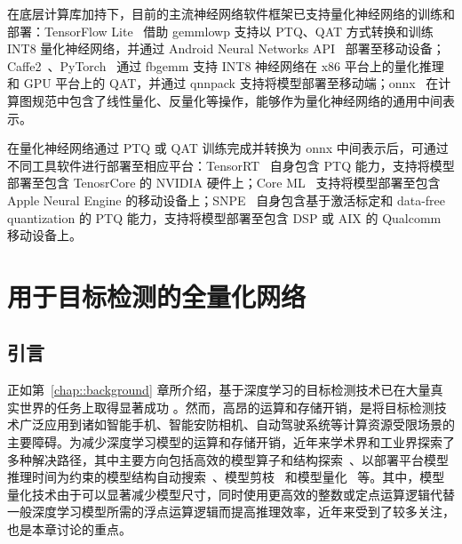 \documentclass[
  fontset = mac,
]{shtthesis}
\begin{document}
在底层计算库加持下，目前的主流神经网络软件框架已支持量化神经网络的训练和部署：TensorFlow Lite~\citep{abadi2016tensorflow} 借助 gemmlowp 支持以 PTQ、QAT 方式转换和训练 INT8 量化神经网络，并通过 Android Neural Networks API~\citep{google2020neurl} 部署至移动设备；Caffe2~\citep{markham2017caffe2}、PyTorch~\citep{paszke2019pytorch} 通过 fbgemm 支持 INT8 神经网络在 x86 平台上的量化推理和 GPU 平台上的 QAT，并通过 qnnpack 支持将模型部署至移动端；onnx~\citep{onnx2019onnx} 在计算图规范中包含了线性量化、反量化等操作，能够作为量化神经网络的通用中间表示。

在量化神经网络通过 PTQ 或 QAT 训练完成并转换为 onnx 中间表示后，可通过不同工具软件进行部署至相应平台：TensorRT~\citep{migacz20178} 自身包含 PTQ 能力，支持将模型部署至包含 TenosrCore 的 NVIDIA 硬件上；Core ML~\citep{apple2020coreml} 支持将模型部署至包含 Apple Neural Engine 的移动设备上；SNPE~\citep{qualcomm2019snpe} 自身包含基于激活标定和 data-free quantization 的 PTQ 能力，支持将模型部署至包含 DSP 或 AIX 的 Qualcomm 移动设备上。
\chapter{用于目标检测的全量化网络} \label{chap::fqn}
\section{引言}
正如第~\ref{chap::background} 章所介绍，基于深度学习的目标检测技术已在大量真实世界的任务上取得显著成功 \citep{lecun2015deep}。然而，高昂的运算和存储开销，是将目标检测技术广泛应用到诸如智能手机、智能安防相机、自动驾驶系统等计算资源受限场景的主要障碍。为减少深度学习模型的运算和存储开销，近年来学术界和工业界探索了多种解决路径，其中主要方向包括高效的模型算子和结构探索~\citep{howard2017mobilenets, Sandler_2018, iandola2016squeezenet, zhang2018shufflenet}、以部署平台模型推理时间为约束的模型结构自动搜索~\citep{wu2019fbnet, tan2019mnasnet, tan2019efficientnet}、模型剪枝~\citep{han2015learning, li2016pruning, chen2018shallowing} 和模型量化~\citep{rastegari2016xnor, zhou2016dorefanet, jacob2018quantization} 等。其中，模型量化技术由于可以显著减少模型尺寸，同时使用更高效的整数或定点运算逻辑代替一般深度学习模型所需的浮点运算逻辑而提高推理效率，近年来受到了较多关注，也是本章讨论的重点。
\end{document}
